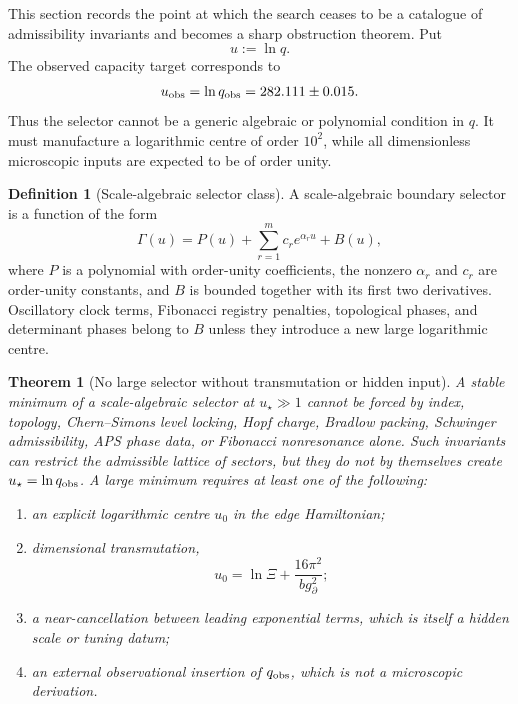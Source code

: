 \documentclass[aps,prd,reprint,nofootinbib,superscriptaddress,floatfix]{revtex4-2}
\numberwithin{equation}{section}
\theoremstyle{definition}
\newtheorem{definition}{Definition}[section]
\theoremstyle{plain}
\newtheorem{theorem}{Theorem}[section]
\begin{document}
This section records the point at which the search ceases to be a catalogue of
admissibility invariants and becomes a sharp obstruction theorem.  Put
\begin{equation}
u:=\ln q .
\end{equation}
The observed capacity target corresponds to
\begin{equation}
u_{\rm obs}=\ln q_{\rm obs}=282.111\pm0.015 .
\end{equation}
Thus the selector cannot be a generic algebraic or polynomial condition in
\(q\).  It must manufacture a logarithmic centre of order \(10^2\), while all
dimensionless microscopic inputs are expected to be of order unity.

\begin{definition}[Scale-algebraic selector class]
A scale-algebraic boundary selector is a function of the form
\begin{equation}
\Gamma(u)=P(u)+\sum_{r=1}^{m}c_r e^{\alpha_r u}
          +B(u),
\end{equation}
where \(P\) is a polynomial with order-unity coefficients, the nonzero
\(\alpha_r\) and \(c_r\) are order-unity constants, and \(B\) is bounded
together with its first two derivatives.  Oscillatory clock terms, Fibonacci
registry penalties, topological phases, and determinant phases belong to
\(B\) unless they introduce a new large logarithmic centre.
\end{definition}

\begin{theorem}[No large selector without transmutation or hidden input]
\label{thm:no-large-selector}
A stable minimum of a scale-algebraic selector at \(u_\star\gg1\) cannot be
forced by index, topology, Chern--Simons level locking, Hopf charge, Bradlow
packing, Schwinger admissibility, APS phase data, or Fibonacci nonresonance
alone.  Such invariants can restrict the admissible lattice of sectors, but
they do not by themselves create \(u_\star=\ln q_{\rm obs}\).  A large
minimum requires at least one of the following:
\begin{enumerate}
\item an explicit logarithmic centre \(u_0\) in the edge Hamiltonian;
\item dimensional transmutation,
\[
u_0=\ln\Xi+\frac{16\pi^2}{b g_\partial^2};
\]
\item a near-cancellation between leading exponential terms, which is itself
a hidden scale or tuning datum;
\item an external observational insertion of \(q_{\rm obs}\), which is not a
microscopic derivation.
\end{enumerate}
\end{theorem}
\end{document}
